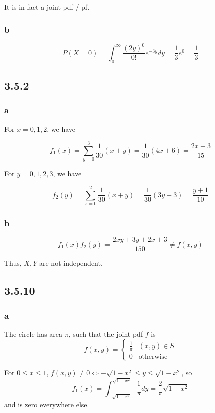 \documentclass[12pt,letterpaper]{article}
\theoremstyle{definition}
\begin{document}
It is in fact a joint pdf / pf.

\subsubsection*{b}

\[
  P(X = 0) = \int_0^\infty\frac{(2y)^0}{0!}e^{-3y}dy = \frac{1}{3}e^0 = \frac{1}{3}
\]

\subsection*{3.5.2}

\subsubsection*{a}

For $x = 0, 1, 2$, we have

\[
  f_1(x) = \sum_{y=0}^3\frac{1}{30}(x + y) = \frac{1}{30}(4x + 6) = \frac{2x+3}{15}
\]

For $y = 0, 1, 2, 3$, we have

\[
  f_2(y) = \sum_{x=0}^2\frac{1}{30}(x + y) = \frac{1}{30}(3y + 3) = \frac{y+1}{10}
\]

\subsubsection*{b}

\[
  f_1(x)f_2(y) = \frac{2xy + 3y + 2x + 3}{150} \neq f(x, y)
\]

Thus, $X, Y$ are not independent.

\subsection*{3.5.10}

\subsubsection*{a}

The circle has area $\pi$, such that the joint pdf $f$ is
\[
  f(x, y) = \begin{cases}
    \frac{1}{\pi} & (x, y) \in S \\
    0 & \text{otherwise}
  \end{cases}
\]

For $0 \leq x \leq 1$, $f(x, y) \neq 0 \iff -\sqrt{1-x^2} \leq y \leq
\sqrt{1-x^2}$, so
\[
  f_1(x) = \int_{-\sqrt{1-x^2}}^{\sqrt{1-x^2}}\frac{1}{\pi}dy = \frac{2}{\pi}\sqrt{1-x^2}
\]
and is zero everywhere else.
\end{document}
